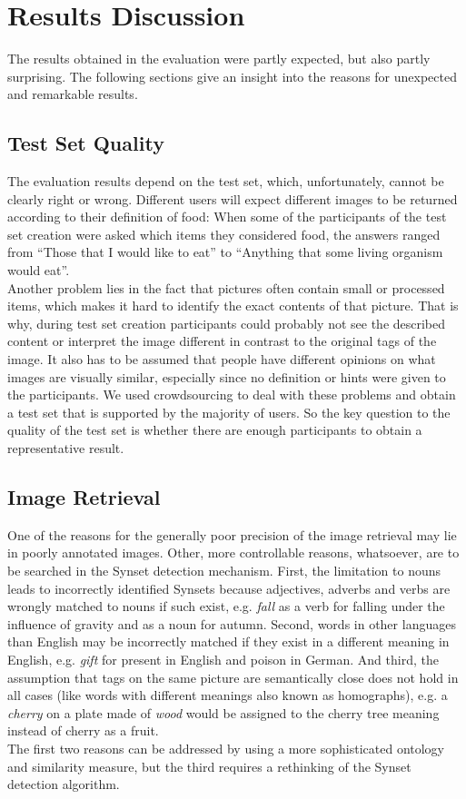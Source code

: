 %
\section{Results Discussion}
\label{sec_discussion}

The results obtained in the evaluation were partly expected, but also partly surprising. The following sections give an insight into the reasons for unexpected and remarkable results.

\subsection{Test Set Quality}
The evaluation results depend on the test set, which, unfortunately, cannot be clearly right or wrong. Different users will expect different images to be returned according to their definition of food: When some of the participants of the test set creation were asked which items they considered food, the answers ranged from ``Those that I would like to eat'' to ``Anything that some living organism would eat''. \\
Another problem lies in the fact that pictures often contain small or processed items, which makes it hard to identify the exact contents of that picture. That is why, during test set creation participants could probably not see the described content or interpret the image different in contrast to the original tags of the image.
It also has to be assumed that people have different opinions on what images are visually similar, especially since no definition or hints were given to the participants. We used crowdsourcing to deal with these problems and obtain a test set that is supported by the majority of users. So the key question to the quality of the test set is whether there are enough participants to obtain a representative result.

\subsection{Image Retrieval}
One of the reasons for the generally poor precision of the image retrieval may lie in poorly annotated images.
Other, more controllable reasons, whatsoever, are to be searched in the Synset detection mechanism.
First, the limitation to nouns leads to incorrectly identified Synsets because adjectives, adverbs and verbs are wrongly matched to nouns if such exist, e.g. \emph{fall} as a verb for falling under the influence of gravity and as a noun for autumn.
Second, words in other languages than English may be incorrectly matched if they exist in a different meaning in English, e.g. \emph{gift} for present in English and poison in German.
And third, the assumption that tags on the same picture are semantically close does not hold in all cases (like words with different meanings also known as homographs), e.g. a \emph{cherry} on a plate made of \emph{wood} would be assigned to the cherry tree meaning instead of cherry as a fruit. \\
The first two reasons can be addressed by using a more sophisticated ontology and similarity measure, but the third requires a rethinking of the Synset detection algorithm.

